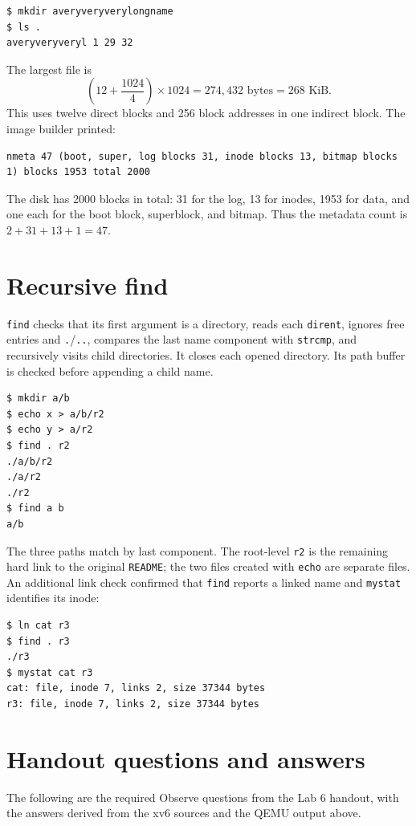 \documentclass[12pt]{article}
\begin{document}
\begin{lstlisting}
$ mkdir averyveryverylongname
$ ls .
averyveryveryl 1 29 32
\end{lstlisting}

The largest file is
\[
  \left(12+\frac{1024}{4}\right)\times1024
  = 274{,}432\text{ bytes} = 268\text{ KiB}.
\]
This uses twelve direct blocks and 256 block addresses in one indirect block.
The image builder printed:

\begin{lstlisting}
nmeta 47 (boot, super, log blocks 31, inode blocks 13, bitmap blocks 1) blocks 1953 total 2000
\end{lstlisting}

The disk has 2000 blocks in total: 31 for the log, 13 for inodes, 1953 for
data, and one each for the boot block, superblock, and bitmap. Thus the
metadata count is $2+31+13+1=47$.

\clearpage
\section{Recursive find}
\texttt{find} checks that its first argument is a directory, reads each
\texttt{dirent}, ignores free entries and \texttt{.}/\texttt{..}, compares the
last name component with \texttt{strcmp}, and recursively visits child
directories. It closes each opened directory. Its path buffer is checked
before appending a child name.

\begin{lstlisting}
$ mkdir a/b
$ echo x > a/b/r2
$ echo y > a/r2
$ find . r2
./a/b/r2
./a/r2
./r2
$ find a b
a/b
\end{lstlisting}

The three paths match by last component. The root-level \texttt{r2} is the
remaining hard link to the original \texttt{README}; the two files created
with \texttt{echo} are separate files. An additional link check confirmed
that \texttt{find} reports a linked name and \texttt{mystat} identifies its
inode:

\begin{lstlisting}
$ ln cat r3
$ find . r3
./r3
$ mystat cat r3
cat: file, inode 7, links 2, size 37344 bytes
r3: file, inode 7, links 2, size 37344 bytes
\end{lstlisting}

\clearpage
\section{Handout questions and answers}
The following are the required Observe questions from the Lab 6 handout, with the
answers derived from the xv6 sources and the QEMU output above.
\end{document}
